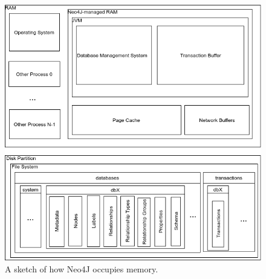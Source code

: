 \documentclass[a4paper,10pt]{article}
\begin{document}
        \begin{figure}[htp]\label{N4J_memory_view}
        \begin{center}
        \includegraphics[keepaspectratio,width=\textwidth]{img/00_intro/N4J_memory_view.png}
        \end{center}
        \caption{A sketch of how Neo4J occupies memory.} %
        \end{figure}
\end{document}
